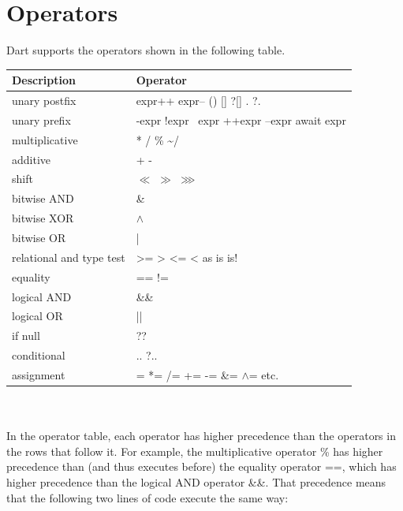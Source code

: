 \section{Operators}
Dart supports the operators shown in the following table. \\[0.3cm]

\begin{tabularx}{\linewidth}{ p{5cm}|p{9cm} } 
	\toprule	
	Description & Operator \\[0.3cm]	
	\midrule
	unary postfix & expr++    expr--    ()    []    ?[]    .    ?.\\[0.3cm]	
	unary prefix & -expr    !expr    ~expr    ++expr    --expr      await expr   \\[0.3cm]
	multiplicative & *    /    \%     \~{}/\\[0.3cm]
	additive & +    -\\[0.3cm]
	shift & $\ll$ $\gg$ \hspace{1cm}  $\ggg$\\[0.3cm]
	bitwise AND & \&\\[0.3cm]
	bitwise XOR & $\land$	 \\[0.3cm]
	bitwise OR & | \\[0.3cm]
	relational and type test & >=    >    <=    <    as    is    is!\\[0.3cm]
	equality & ==    !=   \\[0.3cm]
	logical AND & \&\& \\[0.3cm]
	logical OR & || \\[0.3cm]
	if null & 	?? \\[0.3cm]
	conditional & ..    ?.. \\[0.3cm]
	assignment & = \hspace{1cm}   *= \hspace{1cm}   /=\hspace{1cm}   += \hspace{1cm}  -= \hspace{1cm}   \&= \hspace{1cm}  $\land$= etc.\\
	
	\bottomrule
	
\end{tabularx}
\\\\
In the operator table, each operator has higher precedence than the operators in the rows that follow it. For example, the multiplicative operator \% has higher precedence than (and thus executes before) the equality operator ==, which has higher precedence than the logical AND operator \&\&. That precedence means that the following two lines of code execute the same way:

